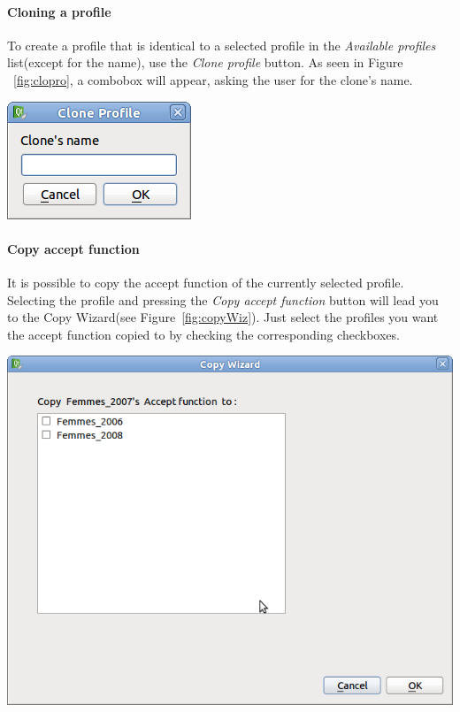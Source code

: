 \documentclass[a4paper,11pt]{report}
\begin{document}
\paragraph{Cloning a profile}
To create a profile that is identical to a selected profile in the \emph{Available profiles} list(except for the name), use the \emph{Clone profile} button. As seen in Figure ~\ref{fig:clopro}, a combobox will appear, asking the user for the clone's name.

\begin{center}
\includegraphics[scale=0.3]{Pictures/Population/Submenu/ClonePro.png}
\label{fig:clopro}
\end{center}

\paragraph{Copy accept function}
It is possible to copy the accept function of the currently selected profile. Selecting the profile and pressing the \emph{Copy accept function} button will lead you to the Copy Wizard(see Figure~\ref{fig:copyWiz}). Just select the profiles you want the accept function copied to by checking the corresponding checkboxes.

\begin{center}
\includegraphics[scale=0.3]{Pictures/Population/Submenu/CopyWiz.png}
\label{fig:copyWiz}
\end{center}
\end{document}
